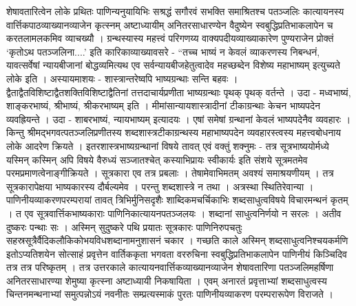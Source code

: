 {शेषावतारित्वेन लोके प्रथितः पाणिन्यनुयायिभिः सश्रद्धं सगौरवं सभक्ति समाश्रितश्च पतञ्जलिः कात्यायनस्य वार्त्तिकपाठव्याख्यानव्याजेन कृत्स्नम् अष्टाध्यायीम् अनितरसाधारण्येन वैदुष्येन स्वबुद्धिप्रतिभाकलापेन च करतलामलकमिव व्याचख्यौ । ग्रन्थस्यास्य महत्त्वं परिगणय्य वाक्यपदीयव्याख्याकारेण पुण्यराजेन प्रोक्तं ‘कृतोऽथ पतञ्जलिना....’ इति कारिकाव्याख्यावसरे - “तच्च भाष्यं न केवलं व्याकरणस्य निबन्धनं, यावत्सर्वेषां न्यायबीजानां बोद्धव्यमित्यथ एव सर्वन्यायबीजहेतुत्वादेव महच्छब्देन विशेष्य महाभाष्यम् इत्युच्यते लोके इति । अस्यायमाशयः - शास्त्रान्तरेष्वपि भाष्यग्रन्थाः सन्ति बहवः । द्वैताद्वैतविशिष्टाद्वैतशक्तिविशिष्टाद्वैतिनां तत्तदाचार्यप्रणीता भाष्यग्रन्थाः पृथक् पृथक् वर्तन्ते । उदा - मध्वभाष्यं, शाङ्करभाष्यं, श्रीभाष्यं, श्रीकरभाष्यम् इति । मीमांसान्यायशास्त्रादीनां टीकाग्रन्थाः केचन भाष्यपदेन व्यवह्रियन्ते । उदा - शाबरभाष्यं, न्यायभाष्यम् इत्यादयः । एषां समेषां ग्रन्थानां केवलं भाष्यपदेनैव व्यवहारः । किन्तु श्रीमद्भगवत्पतञ्जलिप्रणीतस्य शब्दशास्त्रटीकाग्रन्थस्य महाभाष्यपदेन व्यवहारस्त्वस्य महत्त्वबोधनाय लोके आदरेण क्रियते । इतरशास्त्रभाष्यग्रन्थानां विषये तावत् एवं वक्तुं शक्नुमः - तत्र सूत्रभाष्ययोर्मध्ये यस्मिन् कस्मिन् अपि विषये वैरुध्यं सञ्जातश्चेत् कस्याभिप्रायः स्वीकार्यः इति संशये सूत्रमतमेव परमप्रमाणत्वेनाङ्गीक्रियते । सूत्रकारा एव तत्र प्रबलाः । तेषामेवाभिमतम् अवश्यं समाश्रयणीयम् । तत्र सूत्रकारापेक्षया भाष्यकारस्य दौर्बल्यमेव । परन्तु शब्दशास्त्रे न तथा । अत्रस्था स्थितिरेवान्या । पाणिनीयव्याकरणपरम्परायां तावत् त्रिभिर्मुनिसदृशैः शाब्दिकमचर्चिकाभिः शब्दसाधुत्वविषये विचारमन्थनं कृतम् । त एव सूत्रवार्त्तिकभाष्यकाराः पाणिनिकात्यायनपतञ्जलयः । शब्दानां साधुत्वनिर्णयो न सरलः । अतीव दुष्करः पन्थाः सः । अस्मिन् सुदुष्करे पथि प्रयातः सूत्रकारः पाणिनिरुपचतुः सहस्रसूत्रैर्वैदिकलौकिकोभयविधशब्दानामनुशासनं चकार । गच्छति काले अस्मिन् शब्दसाधुत्वनिश्चयकर्मणि इतोऽप्यतिशयेन सोत्साहं प्रवृत्तेन वार्तिककृता भगवता वररुचिना स्वबुद्धिप्रतिभाकलापेन पाणिनीयं किञ्चिदिव तत्र तत्र परिष्कृतम् । तत्र उत्तरकाले कात्यायनवार्त्तिकव्याख्यानव्याजेन शेषावतारिणा पतञ्जलिमहर्षिणा अनितरसाधारण्या शेमुष्या कृत्स्ना अष्टाध्यायी निकषायिता । एवम् अनारतं प्रवृत्ताभ्यां शब्दसाधुत्वस्य चिन्तनमन्थनाभ्यां समुत्पन्नोऽयं नवनीतः सम्प्रत्यस्माकं पुरतः पाणिनीयव्याकरण परम्परारूपेण विराजते ।

}
